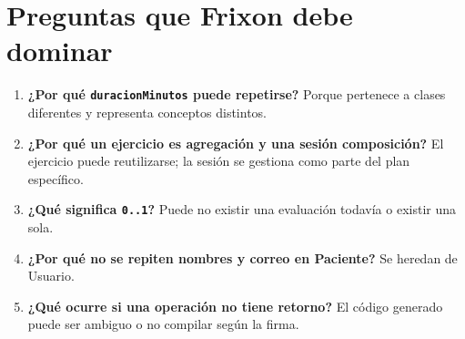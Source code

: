 \section{Preguntas que Frixon debe dominar}
\begin{enumerate}
  \item \textbf{¿Por qué \texttt{duracionMinutos} puede repetirse?} Porque pertenece a clases diferentes y representa conceptos distintos.
  \item \textbf{¿Por qué un ejercicio es agregación y una sesión composición?} El ejercicio puede reutilizarse; la sesión se gestiona como parte del plan específico.
  \item \textbf{¿Qué significa \texttt{0..1}?} Puede no existir una evaluación todavía o existir una sola.
  \item \textbf{¿Por qué no se repiten nombres y correo en Paciente?} Se heredan de Usuario.
  \item \textbf{¿Qué ocurre si una operación no tiene retorno?} El código generado puede ser ambiguo o no compilar según la firma.
\end{enumerate}

\printbibliography[title={Referencias}]

